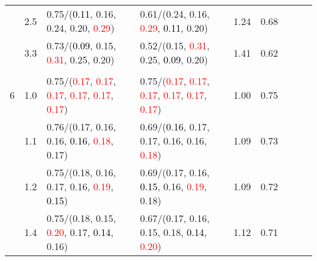 \documentclass[10pt,a4paper]{report}
\begin{document}
\begin{table}[!htbp]
\begin{center}
{\begin{tabular}{ccllccccc}
				  & 2.5                               & 0.75/(\textcolor{black}{0.11}, 0.16, 0.24, 0.20, \textcolor{red}{0.29})                                                                         & 0.61/(0.24, 0.16, \textcolor{red}{0.29}, \textcolor{black}{0.11}, 0.20)                                                                         & 1.24             & 0.68                     \\
				  & 3.3                               & 0.73/(\textcolor{black}{0.09}, 0.15, \textcolor{red}{0.31}, 0.25, 0.20)                                                                         & 0.52/(0.15, \textcolor{red}{0.31}, 0.25, \textcolor{black}{0.09}, 0.20)                                                                         & 1.41             & 0.62                     \\
				  &                                   &                                                                                                                                                 &                                                                                                                                                 &                                             \\
				6 & 1.0                               & 0.75/(\textcolor{red}{0.17}, \textcolor{red}{0.17}, \textcolor{red}{0.17}, \textcolor{red}{0.17}, \textcolor{red}{0.17}, \textcolor{red}{0.17}) & 0.75/(\textcolor{red}{0.17}, \textcolor{red}{0.17}, \textcolor{red}{0.17}, \textcolor{red}{0.17}, \textcolor{red}{0.17}, \textcolor{red}{0.17}) & 1.00             & 0.75                     \\
				  & 1.1                               & 0.76/(0.17, 0.16, 0.16, \textcolor{black}{0.16}, \textcolor{red}{0.18}, 0.17)                                                                   & 0.69/(\textcolor{black}{0.16}, 0.17, 0.17, 0.16, 0.16, \textcolor{red}{0.18})                                                                   & 1.09             & 0.73                     \\
				  & 1.2                               & 0.75/(0.18, 0.16, 0.17, 0.16, \textcolor{red}{0.19}, \textcolor{black}{0.15})                                                                   & 0.69/(0.17, 0.16, \textcolor{black}{0.15}, 0.16, \textcolor{red}{0.19}, 0.18)                                                                   & 1.09             & 0.72                     \\
				  & 1.4                               & 0.75/(0.18, 0.15, \textcolor{red}{0.20}, 0.17, \textcolor{black}{0.14}, 0.16)                                                                   & 0.67/(0.17, 0.16, 0.15, 0.18, \textcolor{black}{0.14}, \textcolor{red}{0.20})                                                                   & 1.12             & 0.71                     \\

\end{tabular}}
\end{center}
\end{table}
\end{document}
